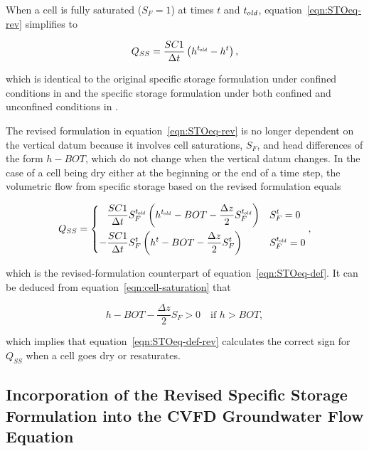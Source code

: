 \noindent When a cell is fully saturated ($S_F = 1$) at times $t$ and ${t_\mathit{\kern -0.07em old}}$, equation~\ref{eqn:STOeq-rev} simplifies to

\begin{equation}
	\label{eqn:STOeq-rev-simp}
	Q_{SS} = \frac{SC1}{\Delta t} \left( h^{t_\mathit{\kern -0.07em old}} - h^t \right) ,
\end{equation}

\noindent which is identical to the original specific storage formulation under confined conditions in \mf and the specific storage formulation under both confined and unconfined conditions in \mff \citep{modflow2005}.

The revised formulation in equation~\ref{eqn:STOeq-rev} is no longer dependent on the vertical datum because it involves cell saturations, $S_F$, and head differences of the form $h - BOT$, which do not change when the vertical datum changes. In the case of a cell being dry either at the beginning  or the end of a time step, the volumetric flow from specific storage based on the revised formulation equals 

\begin{align}
	\label{eqn:STOeq-def-rev}
	Q_{SS} = \begin{dcases}
		\phantom{-} \frac{SC1}{\Delta t} S_F^{t_\mathit{\kern -0.07em old}} \left( h^{t_\mathit{\kern -0.07em old}} - BOT - \frac{\Delta z}{2} S_F^{t_\mathit{\kern -0.07em old}} \right) & S_F^t = 0 \\
		- \frac{SC1}{\Delta t} S_F^t \left( h^t - BOT - \frac{\Delta z}{2} S_F^t \right) & S_F^{t_\mathit{\kern -0.07em old}} = 0
	\end{dcases} ,
\end{align}

\noindent which is the revised-formulation counterpart of equation~\ref{eqn:STOeq-def}. It can be deduced from equation~\ref{eqn:cell-saturation} that

\begin{equation}
	\label{eqn:hterm-sign}
	h - BOT - \frac{\Delta z}{2} S_F > 0 \quad \text{if \ $h > BOT$} ,
\end{equation}

\noindent which implies that equation~\ref{eqn:STOeq-def-rev} calculates the correct sign for $Q_{SS}$ when a cell goes dry or resaturates.

\subsection{Incorporation of the Revised Specific Storage Formulation into the CVFD Groundwater Flow Equation}

